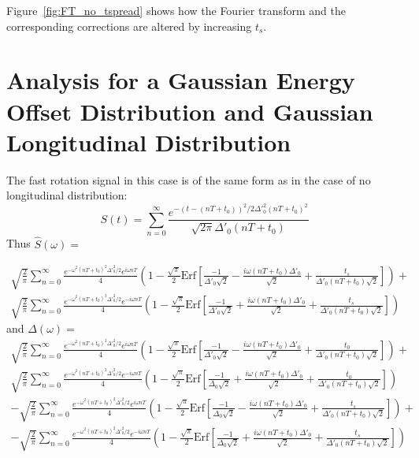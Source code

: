 Figure~\ref{fig:FT_no_tspread} shows how the Fourier transform and the corresponding corrections are altered by increasing $t_s$.

\section{Analysis for a Gaussian Energy Offset Distribution and Gaussian Longitudinal Distribution}

The fast rotation signal in this case is of the same form as in the case of no longitudinal distribution: \[S(t)=\sum^{\infty}_{n=0}\frac{e^{-(t-(nT+t_0))^2/2\Delta'^2_0(nT+t_0)^2}}{\sqrt{2\pi}\Delta'_0(nT+t_0)}\] Thus $\hat{S}(\omega)=$ 

\begin{gather}
\sqrt{\frac{2}{\pi}}\sum^{\infty}_{n=0}\frac{e^{-\omega^2(nT+t_0)^2\Delta'^2_0/2}e^{i\omega nT}}{4}\left(1-\frac{\sqrt{\pi}}{2}\text{Erf}\left[\frac{-1}{\Delta'_0\sqrt{2}}-\frac{i\omega (nT+t_0)\Delta'_0}{\sqrt{2}}+\frac{t_s}{\Delta'_0(nT+t_0)\sqrt{2}}\right]\right)+ \nonumber \\
\sqrt{\frac{2}{\pi}}\sum^{\infty}_{n=0}\frac{e^{-\omega^2(nT+t_0)^2\Delta'^2_0/2}e^{-i\omega nT}}{4}\left(1-\frac{\sqrt{\pi}}{2}\text{Erf}\left[\frac{-1}{\Delta'_0\sqrt{2}}+\frac{i\omega (nT+t_0)\Delta'_0}{\sqrt{2}}+\frac{t_s}{\Delta'_0(nT+t_0)\sqrt{2}}\right]\right)
\end{gather}
and $\Delta(\omega)=$
\begin{gather}
\sqrt{\frac{2}{\pi}}\sum^{\infty}_{n=0}\frac{e^{-\omega^2(nT+t_0)^2\Delta'^2_0/2}e^{i\omega nT}}{4}\left(1-\frac{\sqrt{\pi}}{2}\text{Erf}\left[\frac{-1}{\Delta'_0\sqrt{2}}-\frac{i\omega (nT+t_0)\Delta'_0}{\sqrt{2}}+\frac{t_0}{\Delta'_0(nT+t_0)\sqrt{2}}\right]\right)+ \nonumber \\
\sqrt{\frac{2}{\pi}}\sum^{\infty}_{n=0}\frac{e^{-\omega^2(nT+t_0)^2\Delta'^2_0/2}e^{-i\omega nT}}{4}\left(1-\frac{\sqrt{\pi}}{2}\text{Erf}\left[\frac{-1}{\Delta_0\sqrt{2}}+\frac{i\omega (nT+t_0)\Delta'_0}{\sqrt{2}}+\frac{t_0}{\Delta'_0(nT+t_0)\sqrt{2}}\right]\right) \nonumber \\
-\sqrt{\frac{2}{\pi}}\sum^{\infty}_{n=0}\frac{e^{-\omega^2(nT+t_0)^2\Delta'^2_0/2}e^{i\omega nT}}{4}\left(1-\frac{\sqrt{\pi}}{2}\text{Erf}\left[\frac{-1}{\Delta_0\sqrt{2}}-\frac{i\omega (nT+t_0)\Delta'_0}{\sqrt{2}}+\frac{t_s}{\Delta'_0(nT+t_0)\sqrt{2}}\right]\right)+ \nonumber \\
-\sqrt{\frac{2}{\pi}}\sum^{\infty}_{n=0}\frac{e^{-\omega^2(nT+t_0)^2\Delta'^2_0/2}e^{-i\omega nT}}{4}\left(1-\frac{\sqrt{\pi}}{2}\text{Erf}\left[\frac{-1}{\Delta_0\sqrt{2}}+\frac{i\omega (nT+t_0)\Delta'_0}{\sqrt{2}}+\frac{t_s}{\Delta'_0(nT+t_0)\sqrt{2}}\right]\right)
\end{gather}

